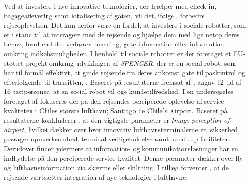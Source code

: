 Ved at investere i nye innovative teknologier, der hjælper med check-in, bagageaflevering samt lokalisering af gaten, vil det, ifølge \textcite[s. 352]{PDF:TheImpactOfTraveler}, forbedre rejseoplevelsen. Det kan derfor være en fordel, at investere i sociale robotter, som er i stand til at interagere med de rejsende og hjælpe dem med lige netop deres behov, hvad end det vedrører boarding, gate information eller information omkring indkøbsmuligheder. I henhold til sociale robotter er der foretaget et EU-støttet projekt omkring udviklingen af \textit{SPENCER}, der er en social robot, som har til formål effektivt, at guide rejsende fra deres ankomst gate til paskontrol og efterfølgende til transitten, \parencite[s. 609]{PDF:SpencerProject}. Baseret på resultaterne fremsat af \textcite[s. 150]{PDF:AGuideRobotAiport}, angav 12 ud af 16 testpersoner, at en social robot vil øge kundetilfredshed.\blankline   
%
I en undersøgelse foretaget af \textcite{PDF:CustomerPerceptionOfService} fokuseres der på den rejsendes perciperede oplevelse af service kvaliteten i Chiles største lufthavn; Santiago de Chile's Airport. Baseret på resultaterne konkluderer \textcite[s. 213]{PDF:CustomerPerceptionOfService}, at den vigtigste parameter er \textit{Image perception of airport}, hvilket dækker over hvor innovativ lufthavnsterminalerne er, sikkerhed, passager opmærksomhed, terminal vedligeholdelse samt handicap faciliteter. Derudover finder \textcite[s. 213]{PDF:CustomerPerceptionOfService} ydermere at information- og kommunikationsløsninger har en indflydelse på den perciperede service kvalitet. Denne parameter dækker over fly- og lufthavnsinformation via skærme eller skiltning. I tillæg forventer \textcite[s. 210]{PDF:CustomerPerceptionOfService}, at de rejsende værtsætter integration af nye teknologier i lufthavne.   

